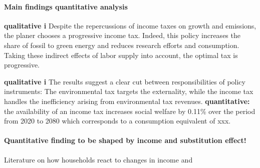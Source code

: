 \paragraph{Main findings quantitative analysis}
\textbf{qualitative i}
Despite the repercussions of income taxes on growth and emissions, the planer chooses a progressive income tax. 
Indeed, this policy increases the share of fossil to green energy and reduces research efforts and consumption. Taking these indirect effects of labor supply into account, the optimal tax is progressive. 

\textbf{qualitative i}
The results suggest a clear cut between responsibilities of policy instruments: The environmental tax targets the externality, while the income tax handles the inefficiency arising from environmental tax revenues.
\textbf{quantitative:} the availability of an income tax increases social welfare by 0.11\% over the period from 2020 to 2080 which corresponds to a consumption equivalent of xxx. 

\paragraph{Quantitative finding to be shaped by income and substitution effect!}
Literature on how households react to changes in income \cite{Bick2018HowImplications} and \cite{Boppart2019LaborPerspectiveb}




